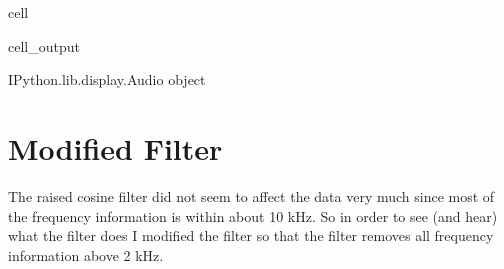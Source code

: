 \documentclass[letterpaper,10pt,english]{jupyterBook}
\begin{document}
\begin{sphinxuseclass}{cell}
\begin{sphinxVerbatimOutput}
\begin{sphinxuseclass}{cell_output}
\noindent{}

\begin{sphinxVerbatim}[commandchars=\\\{\}]
\PYGZlt{}IPython.lib.display.Audio object\PYGZgt{}
\end{sphinxVerbatim}

\end{sphinxuseclass}\end{sphinxVerbatimOutput}

\end{sphinxuseclass}

\section{Modified Filter}
\label{\detokenize{content/0_project_part2:modified-filter}}
\sphinxAtStartPar
The raised cosine filter did not seem to affect the data very much since most of the frequency information is within about 10 kHz. So in order to see (and hear) what the filter does I modified the filter so that the filter removes all frequency information above 2 kHz.
\end{document}
